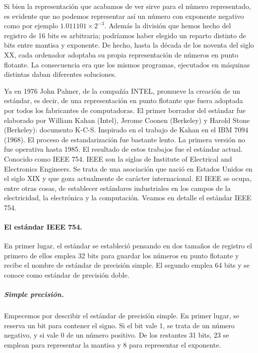 \begin{paracol}{2}
Si bien la representación que acabamos de ver sirve para el número representado, es evidente que no podemos representar así un número con exponente negativo como por ejemplo $1.011101\times 2^{-3}$. Además la división que hemos hecho del registro de 16 bits es arbitraria; podríamos haber elegido un reparto distinto de bits entre mantisa y exponente. De hecho, hasta la década de los noventa del siglo XX, cada ordenador adoptaba su propia representación de números en punto flotante. La consecuencia era que los mismos programas, ejecutados en máquinas distintas daban diferentes soluciones. 

Ya en 1976 John Palmer, de la compañía INTEL, promueve la creación de un estándar, es decir, de una representación en punto flotante que fuera adoptada por todos los fabricantes de computadoras. El primer borrador del estándar fue elaborado por William Kahan (Intel), Jerome Coonen (Berkeley) y Harold Stone (Berkeley): documento K-C-S. Inspirado en el trabajo de Kahan en el IBM 7094 (1968). El proceso de estandarización fue bastante lento. La primera versión no fue operativa hasta 1985. El resultado de estos trabajos fue el estándar actual. Conocido como IEEE 754. IEEE son la siglas de Institute of Electrical and Electronics Engineers. Se trata de una asociación que nació en Estados Unidos en el siglo XIX y que goza actualmente de carácter internacional. El IEEE se ocupa, entre otras cosas, de establecer estándares industriales en los campos de la electricidad, la electrónica y la computación. Veamos en detalle el estándar IEEE 754.

\paragraph*{El estándar IEEE 754.}
En primer lugar, el estándar se estableció pensando en dos tamaños de registro el primero de ellos emplea 32 bits para guardar los números en punto flotante y recibe el nombre de estándar de precisión simple. El segundo emplea 64 bits y se conoce como estándar de precisión doble.

\subparagraph*{Simple precisión.} Empecemos por describir el estándar de precisión simple. En primer lugar, se reserva un bit para contener el signo. Si el bit vale 1, se trata de un número negativo, y si vale 0 de un número positivo. De los restantes 31 bits, 23 se emplean para representar la mantisa y 8 para representar el exponente.


\end{paracol}
